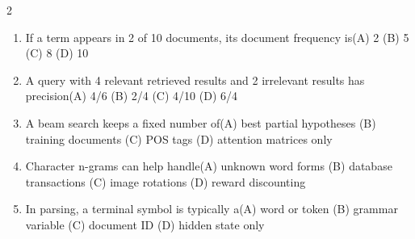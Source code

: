 \documentclass[a4paper]{article}
\begin{document}
\begin{multicols*}{2}
\begin{enumerate}[resume]
\item If a term appears in 2 of 10 documents, its document frequency is\newline\hspace*{0.6em}(A) 2 \quad (B) 5 \newline\hspace*{0.6em}(C) 8 \quad (D) 10
\item A query with 4 relevant retrieved results and 2 irrelevant results has precision\newline\hspace*{0.6em}(A) 4/6 \quad (B) 2/4 \newline\hspace*{0.6em}(C) 4/10 \quad (D) 6/4
\item A beam search keeps a fixed number of\newline\hspace*{0.6em}(A) best partial hypotheses \quad (B) training documents \newline\hspace*{0.6em}(C) POS tags \quad (D) attention matrices only
\item Character n-grams can help handle\newline\hspace*{0.6em}(A) unknown word forms \quad (B) database transactions \newline\hspace*{0.6em}(C) image rotations \quad (D) reward discounting
\item In parsing, a terminal symbol is typically a\newline\hspace*{0.6em}(A) word or token \quad (B) grammar variable \newline\hspace*{0.6em}(C) document ID \quad (D) hidden state only
\end{enumerate}
\end{multicols*}
\end{document}
